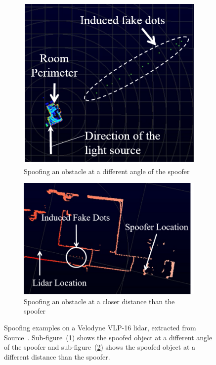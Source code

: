 \begin{figure}[H]
	\centering
	\begin{subfigure}[c]{0.4\textwidth}
	\includegraphics[width=\textwidth]{img/lidar/interference_angle_control.png}
		\caption{Spoofing an obstacle at a different angle of the spoofer}
		\label{fig:shinInterferenceAngle}
	\end{subfigure}
	\quad
	\begin{subfigure}[c]{0.55\textwidth}
		\includegraphics[width=\textwidth]{img/lidar/interference_distance_control.png}
		\caption{Spoofing an obstacle at a closer distance than the spoofer}
		\label{fig:shinInterferenceDistance}
	\end{subfigure}
	\caption{Spoofing examples on a Velodyne VLP-16 \ac{lidar}, extracted from Source~\cite{Shin2017}. Sub-figure~(\ref{fig:shinInterferenceAngle}) shows the spoofed object at a different angle of the spoofer and sub-figure~(\ref{fig:shinInterferenceDistance}) shows the spoofed object at a different distance than the spoofer.}
	\label{fig:shinInterference}
\end{figure}



